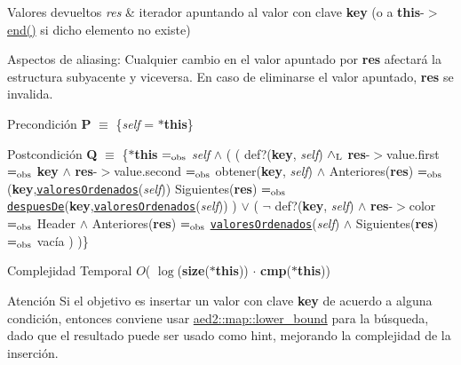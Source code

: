 \begin{DoxyRetVals}{Valores devueltos}
{\em res} & iterador apuntando al valor con clave {\bfseries key} (o a {\bfseries this}-\/$>$\hyperlink{classaed2_1_1map_a76023e6a56cb625513e1b5ea028bf983_a76023e6a56cb625513e1b5ea028bf983}{end()} si dicho elemento no existe)\\
\hline
\end{DoxyRetVals}
\begin{DoxyParagraph}{Aspectos de aliasing\-:}
Cualquier cambio en el valor apuntado por {\bfseries res} afectará la estructura subyacente y viceversa. En caso de eliminarse el valor apuntado, {\bfseries res} se invalida.
\end{DoxyParagraph}
\begin{DoxyPrecond}{Precondición}
{\bfseries P} $\equiv$ \{{\itshape self} = {\bfseries $\ast$this}\} 
\end{DoxyPrecond}
\begin{DoxyPostcond}{Postcondición}
{\bfseries Q} $\equiv$ \{{\bfseries $\ast$this} $=_{\rm obs}$ {\itshape self} $\land$ ( ( def?({\bfseries key}, {\itshape self}) $\land_{\rm L}$ {\bfseries res}-\/$>$value.\-first $=_{\rm obs}$ {\bfseries key} $\land$ {\bfseries res}-\/$>$value.\-second $=_{\rm obs}$ obtener({\bfseries key}, {\itshape self}) $\land$ Anteriores({\bfseries res}) $=_{\rm obs}$ ({\bfseries key},\href{axiomas.html#valoresOrdenados}{\tt valores\-Ordenados}({\itshape self})) Siguientes({\bfseries res}) $=_{\rm obs}$ \href{axiomas.html#despuesDe}{\tt despues\-De}({\bfseries key},\href{axiomas.html#valoresOrdenados}{\tt valores\-Ordenados}({\itshape self})) ) $\lor$ ( $\lnot$ def?({\bfseries key}, {\itshape self}) $\land$ {\bfseries res}-\/$>$color $=_{\rm obs}$ Header $\land$ Anteriores({\bfseries res}) $=_{\rm obs}$ \href{axiomas.html#valoresOrdenados}{\tt valores\-Ordenados}({\itshape self}) $\land$ Siguientes({\bfseries res}) $=_{\rm obs}$ vacía ) )\}
\end{DoxyPostcond}

\begin{DoxyDescription}
\item[Complejidad Temporal]$O$( $\log$({\bfseries size}({\bfseries $\ast$this})) $\cdot$ {\bfseries cmp}({\bfseries $\ast$this}))
\end{DoxyDescription}

\begin{DoxyAttention}{Atención}
Si el objetivo es insertar un valor con clave {\bfseries key} de acuerdo a alguna condición, entonces conviene usar \hyperlink{classaed2_1_1map_a3399d36fdd5a880b494f3a5795d3f18f_a3399d36fdd5a880b494f3a5795d3f18f}{aed2\-::map\-::lower\-\_\-bound} para la búsqueda, dado que el resultado puede ser usado como hint, mejorando la complejidad de la inserción. 
\end{DoxyAttention}


